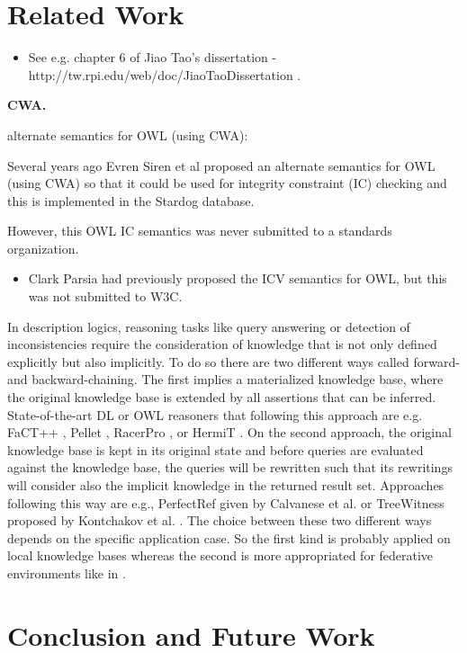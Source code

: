 \documentclass{llncs}
\begin{document}
\section{Related Work}

\begin{itemize}
	\item See e.g. chapter 6 of Jiao Tao's dissertation - http://tw.rpi.edu/web/doc/JiaoTaoDissertation .
\end{itemize}

\textbf{CWA.}

alternate semantics for OWL (using CWA):

Several years ago Evren Siren et al proposed an alternate semantics for OWL (using CWA) so that it could be used for integrity constraint (IC) checking and this is implemented in the Stardog database. 

However, this OWL IC semantics was never submitted to a standards organization.

\begin{itemize}
	\item Clark Parsia had previously proposed the ICV semantics for OWL, but this was not submitted to W3C.
\end{itemize}

In description logics, reasoning tasks like query answering or detection of inconsistencies require the consideration of knowledge that is not only defined explicitly but also implicitly. To do so there are two different ways called forward- and backward-chaining. The first implies a materialized knowledge base, where the original knowledge base is extended by all assertions that can be inferred. State-of-the-art DL or OWL reasoners that following this approach are e.g. FaCT++ \cite{tsarkov2006fact++}, Pellet \cite{sirin2007pellet},  RacerPro \cite{haarslev2001racer}, or HermiT \cite{horrocks2012hermit}. On the second approach, the original knowledge base is kept in its original state and before queries are evaluated against the knowledge base, the queries will be rewritten such that its rewritings will consider also the implicit knowledge in the returned result set. Approaches following this way are e.g., \textsf{PerfectRef} given by Calvanese et al. \cite{Calvanese2007} or \textsf{TreeWitness} proposed by Kontchakov et al. \cite{kontchakov2011combined}. The choice between these two different ways depends on the specific application case. So the first kind is probably applied on local knowledge bases whereas the second is more appropriated for federative environments like in \cite{nolle2014efficient,nolle2013elite}.


\section{Conclusion and Future Work}

{}

\setcounter{tocdepth}{1}
\end{document}

